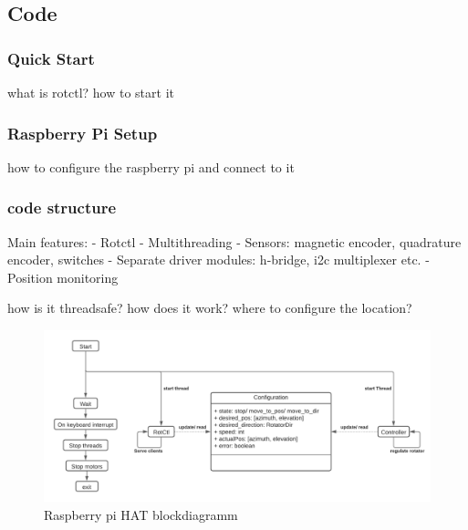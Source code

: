 \subsection{Code}

\subsubsection{Quick Start}
what is rotctl?
how to start it

\subsubsection{Raspberry Pi Setup}
how to configure the raspberry pi and connect to it


\subsubsection{code structure}
Main features:
- Rotctl
- Multithreading
- Sensors: magnetic encoder, quadrature
encoder, switches
- Separate driver modules: h-bridge, i2c
multiplexer etc.
- Position monitoring

how is it threadsafe?
how does it work?
where to configure the location?



\begin{figure}[h]
	\centering
	\includegraphics[width=\linewidth]{../art/Code flow chart.pdf}
	\caption{Raspberry pi HAT blockdiagramm}
\end{figure}



